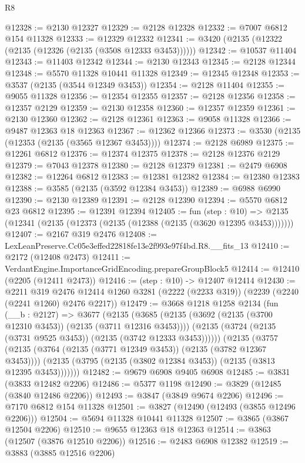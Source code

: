 \begin{lexlean}{R8}
\begin{coremodule}
@12328 := @2130 @12327
@12329 := @2128 @12328
@12332 := @7007 @6812 @154 @11328
@12333 := @12329 @12332
@12341 := @3420 (@2135 (@12322 (@2135 (@12326 (@2135 (@3508 @12333 @3453))))))
@12342 := @10537 @11404
@12343 := @11403 @12342
@12344 := @2130 @12343
@12345 := @2128 @12344
@12348 := @5570 @11328 @10441 @11328
@12349 := @12345 @12348
@12353 := @3537 (@2135 (@3544 @12349 @3453))
@12354 := @2128 @11404
@12355 := @9055 @11328
@12356 := @12354 @12355
@12357 := @2128 @12356
@12358 := @12357 @2129
@12359 := @2130 @12358
@12360 := @12357 @12359
@12361 := @2130 @12360
@12362 := @2128 @12361
@12363 := @9058 @11328
@12366 := @9487 @12363 @18 @12363
@12367 := @12362 @12366
@12373 := @3530 (@2135 (@12353 (@2135 (@3565 @12367 @3453))))
@12374 := @2128 @6989
@12375 := @12261 @6812
@12376 := @12374 @12375
@12378 := @2128 @12376 @2129
@12379 := @7043 @12378
@12380 := @2128 @12379
@12381 := @2479 @6908
@12382 := @12264 @6812
@12383 := @12381 @12382
@12384 := @12380 @12383
@12388 := @3585 (@2135 (@3592 @12384 @3453))
@12389 := @6988 @6990
@12390 := @2130 @12389
@12391 := @2128 @12390
@12394 := @5570 @6812 @23 @6812
@12395 := @12391 @12394
@12405 := fun (step : @10) =>
  @2135 (@12341 (@2135 (@12373 (@2135 (@12388 (@2135 (@3620 @12395 @3453)))))))
@12407 := @2167 @319 @2476
@12408 := LexLeanPreserve.Cc05e3effed22818fe13e2f993e97f4bd.R8.__fits_13
@12410 := @2172 (@12408 @2473)
@12411 := VerdantEngine.ImportanceGridEncoding.prepareGroupBlock5
@12414 := @12410 (@2205 (@12411 @2473))
@12416 := (step : @10) -> @12407 @12414
@12430 := @2211
    @319
    @2476
    @12414
    @1260
    @3281
    (@2222 (@2233 @319))
    (@2239 (@2240 (@2241 @1260) @2476 @2217))
@12479 := @3668
    @1218
    @1258
    @2134
    (fun (__b : @2127) =>
    @3677
      (@2135
        (@3685
          (@2135 (@3692 (@2135 (@3700 @12310 @3453)) (@2135 (@3711 @12316 @3453))))
          (@2135 (@3724 (@2135 (@3731 @9525 @3453)) (@2135 (@3742 @12333 @3453))))))
      (@2135
        (@3757
          (@2135 (@3764 (@2135 (@3771 @12349 @3453)) (@2135 (@3782 @12367 @3453))))
          (@2135 (@3795 (@2135 (@3802 @12384 @3453)) (@2135 (@3813 @12395 @3453)))))))
@12482 := @9679 @6908 @9405 @6908
@12485 := @3831 (@3833 @12482 @2206)
@12486 := @5377 @1198
@12490 := @3829 (@12485 (@3840 @12486 @2206))
@12493 := @3847 (@3849 @9674 @2206)
@12496 := @7170 @6812 @154 @11328
@12501 := @3827 (@12490 (@12493 (@3855 @12496 @2206)))
@12504 := @5694 @11328 @10441 @11328
@12507 := @3865 (@3867 @12504 @2206)
@12510 := @9655 @12363 @18 @12363
@12514 := @3863 (@12507 (@3876 @12510 @2206))
@12516 := @2483 @6908 @12382
@12519 := @3883 (@3885 @12516 @2206)

\end{coremodule}
\end{lexlean}
